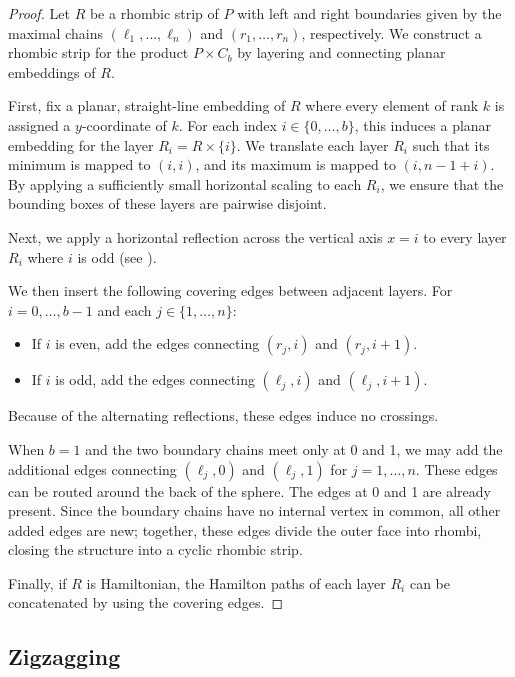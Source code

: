\documentclass[fontsize=11pt,a4paper,DIV=12]{scrartcl}
\begin{document}
\unfolding*
\begin{proof}
	Let $R$ be a rhombic strip of $P$ with left and right boundaries given by the maximal chains $(\ell_1, \ldots, \ell_n)$ and $(r_1, \ldots, r_n)$, respectively. We construct a rhombic strip for the product $P \times C_b$ by layering and connecting planar embeddings of $R$.

	First, fix a planar, straight-line embedding of $R$ where every element of rank $k$ is assigned a $y$-coordinate of $k$. For each index $i \in \{0, \ldots, b\}$, this induces a planar embedding for the layer $R_i = R \times \{i\}$. We translate each layer $R_i$ such that its minimum is mapped to $(i, i)$, and its maximum is mapped to $(i, n-1+i)$. By applying a sufficiently small horizontal scaling to each $R_i$, we ensure that the bounding boxes of these layers are pairwise disjoint.

	Next, we apply a horizontal reflection across the vertical axis $x=i$ to every layer $R_i$ where $i$ is odd (see ).

	We then insert the following covering edges between adjacent layers. For $i=0,\ldots,b-1$ and each $j \in \{1,\ldots,n\}$:
	\begin{itemize}
		\item If $i$ is even, add the edges connecting $(r_j, i)$ and $(r_j, i+1)$.
		\item If $i$ is odd, add the edges connecting $(\ell_j, i)$ and $(\ell_j, i+1)$.
	\end{itemize}

	Because of the alternating reflections, these edges induce no crossings.

	When $b=1$ and the two boundary chains meet only at 0 and 1, we may add the additional edges connecting $(\ell_j, 0)$ and $(\ell_j, 1)$ for $j = 1, \ldots, n$. These edges can be routed around the back of the sphere. The edges at 0 and 1 are already present. Since the boundary chains have no internal vertex in common, all other added edges are new; together, these edges divide the outer face into rhombi, closing the structure into a cyclic rhombic strip.

	Finally, if $R$ is Hamiltonian, the Hamilton paths of each layer $R_i$ can be concatenated by using the covering edges.
\end{proof}

\subsection{Zigzagging}
\end{document}
